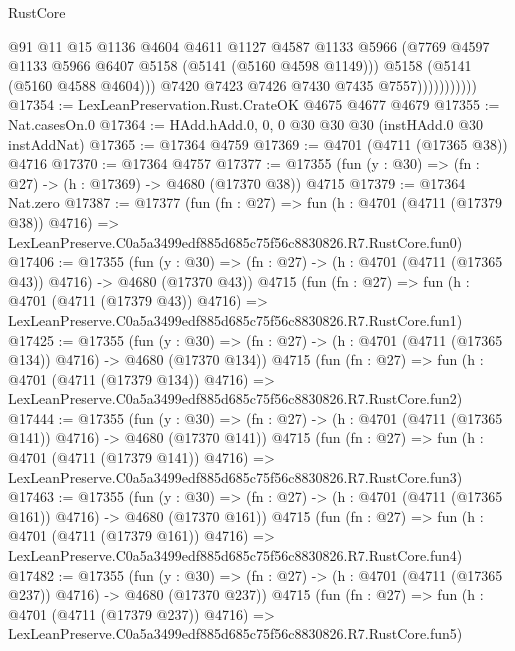 \begin{lexlean}{RustCore}
\begin{coremodule}
                            @91
                            @11
                            @15
                            @1136
                            @4604
                            @4611
                            @1127
                            @4587
                            @1133
                            @5966
                            (@7769 @4597 @1133 @5966 @6407 @5158 (@5141 (@5160 @4598 @1149)))
                            @5158
                            (@5141 (@5160 @4588 @4604)))
                          @7420
                          @7423
                          @7426
                          @7430
                          @7435
                          @7557)))))))))))
@17354 := LexLeanPreservation.Rust.CrateOK @4675 @4677 @4679
@17355 := Nat.casesOn.{0}
@17364 := HAdd.hAdd.{0, 0, 0} @30 @30 @30 (instHAdd.{0} @30 instAddNat)
@17365 := @17364 @4759
@17369 := @4701 (@4711 (@17365 @38)) @4716
@17370 := @17364 @4757
@17377 := @17355 (fun (y : @30) => (fn : @27) -> (h : @17369) -> @4680 (@17370 @38)) @4715
@17379 := @17364 Nat.zero
@17387 := @17377
    (fun (fn : @27) =>
    fun (h : @4701 (@4711 (@17379 @38)) @4716) =>
    LexLeanPreserve.C0a5a3499edf885d685c75f56c8830826.R7.RustCore.fun0)
@17406 := @17355
    (fun (y : @30) => (fn : @27) -> (h : @4701 (@4711 (@17365 @43)) @4716) -> @4680 (@17370 @43))
    @4715
    (fun (fn : @27) =>
    fun (h : @4701 (@4711 (@17379 @43)) @4716) =>
    LexLeanPreserve.C0a5a3499edf885d685c75f56c8830826.R7.RustCore.fun1)
@17425 := @17355
    (fun (y : @30) => (fn : @27) -> (h : @4701 (@4711 (@17365 @134)) @4716) -> @4680 (@17370 @134))
    @4715
    (fun (fn : @27) =>
    fun (h : @4701 (@4711 (@17379 @134)) @4716) =>
    LexLeanPreserve.C0a5a3499edf885d685c75f56c8830826.R7.RustCore.fun2)
@17444 := @17355
    (fun (y : @30) => (fn : @27) -> (h : @4701 (@4711 (@17365 @141)) @4716) -> @4680 (@17370 @141))
    @4715
    (fun (fn : @27) =>
    fun (h : @4701 (@4711 (@17379 @141)) @4716) =>
    LexLeanPreserve.C0a5a3499edf885d685c75f56c8830826.R7.RustCore.fun3)
@17463 := @17355
    (fun (y : @30) => (fn : @27) -> (h : @4701 (@4711 (@17365 @161)) @4716) -> @4680 (@17370 @161))
    @4715
    (fun (fn : @27) =>
    fun (h : @4701 (@4711 (@17379 @161)) @4716) =>
    LexLeanPreserve.C0a5a3499edf885d685c75f56c8830826.R7.RustCore.fun4)
@17482 := @17355
    (fun (y : @30) => (fn : @27) -> (h : @4701 (@4711 (@17365 @237)) @4716) -> @4680 (@17370 @237))
    @4715
    (fun (fn : @27) =>
    fun (h : @4701 (@4711 (@17379 @237)) @4716) =>
    LexLeanPreserve.C0a5a3499edf885d685c75f56c8830826.R7.RustCore.fun5)

\end{coremodule}
\end{lexlean}
